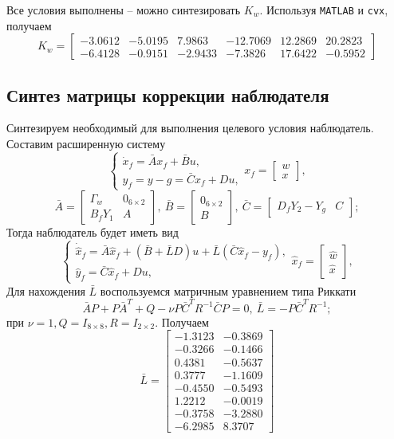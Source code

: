 \documentclass[a4paper, 12pt]{article}
\begin{document}
    Все условия выполнены -- можно синтезировать $K_w$. Используя \texttt{MATLAB} и \texttt{cvx},
    получаем
    $$
    K_w=\begin{bmatrix}
    -3.0612   &-5.0195    &7.9863  &-12.7069   &12.2869   &20.2823\\
   -6.4128   &-0.9151   &-2.9433   &-7.3826   &17.6422   &-0.5952
    \end{bmatrix}
    $$


    \subsection{Синтез матрицы коррекции наблюдателя}
    Синтезируем необходимый для выполнения целевого условия наблюдатель.
    Составим расширенную систему
    $$
    \begin{cases}
    \dot{x}_f=\bar{A}x_f+\bar{B}u,\\
    y_f=y-g=\bar{C}x_f+Du,
    \end{cases} x_f=\begin{bmatrix}
        w\\x
    \end{bmatrix},
    $$
    $$
    \bar{A}=\begin{bmatrix}
        \Gamma_w &0_{6\times2}\\
        B_fY_1 &A
    \end{bmatrix},\ \bar{B}=\begin{bmatrix}
        0_{6\times2}\\B
    \end{bmatrix},\ \bar{C}=\begin{bmatrix}
        D_fY_2-Y_g &C
    \end{bmatrix};
    $$
    Тогда наблюдатель будет иметь вид
    $$
    \begin{cases}
    \dot{\hat{x}}_f=\bar{A}\hat{x}_f+\left( \bar{B}+\bar{L}D \right)u+\bar{L}\left( \bar{C}\hat{x}_f-y_f \right),\\
    \hat{y}_f=\bar{C}\hat{x}_f+Du,
    \end{cases} \hat{x}_f=\begin{bmatrix}
        \hat{w}\\\hat{x}
    \end{bmatrix},
    $$
    Для нахождения $\bar{L}$ воспользуемся матричным уравнением типа Риккати
    $$
    \bar{A}P+P\bar{A}^T+Q-\nu P\bar{C}^TR^{-1}\bar{C}P=0,\ \bar{L}=-P\bar{C}^TR^{-1};
    $$
    при $\nu=1,Q=I_{8\times8},R=I_{2\times2}$. Получаем
    $$
    \bar{L}=\begin{bmatrix}
    -1.3123   &-0.3869\\
   -0.3266   &-0.1466\\
    0.4381   &-0.5637\\
    0.3777   &-1.1609\\
   -0.4550   &-0.5493\\
    1.2212   &-0.0019\\
   -0.3758   &-3.2880\\
   -6.2985    &8.3707
    \end{bmatrix}
    $$
\end{document}
